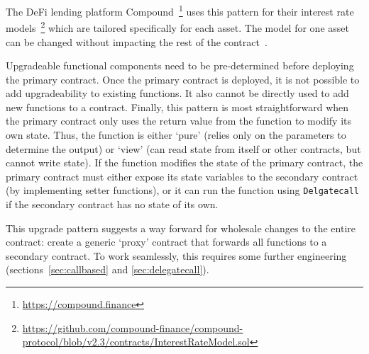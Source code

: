The DeFi lending platform Compound~\footnote{\url{https://compound.finance}} uses this pattern for their interest rate models~\footnote{\url{https://github.com/compound-finance/compound-protocol/blob/v2.3/contracts/InterestRateModel.sol}} which are tailored specifically for each asset. The model for one asset can be changed without impacting the rest of the contract~\cite{openzeppelinPost}.

Upgradeable functional components need to be pre-determined before deploying the primary contract. Once the primary contract is deployed, it is not possible to add upgradeability to existing functions. It also cannot be directly used to add new functions to a contract. Finally, this pattern is most straightforward when the primary contract only uses the return value from the function to modify its own state. Thus, the function is either `pure' (relies only on the parameters to determine the output) or `view' (can read state from itself or other contracts, but cannot write state). If the function modifies the state of the primary contract, the primary contract must either expose its state variables to the secondary contract (by implementing setter functions), or it can run the function using \texttt{Delgatecall} if the secondary contract has no state of its own. 

This upgrade pattern suggests a way forward for wholesale changes to the entire contract: create a generic `proxy' contract that forwards all functions to a secondary contract. To work seamlessly, this requires some further engineering (sections~\ref{sec:callbased} and \ref{sec:delegatecall}).





